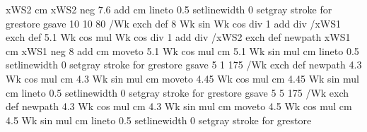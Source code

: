 {{{                    xWS2 cm xWS2 neg 7.6 add cm
                   lineto
                   0.5 setlinewidth
                   0 setgray
                   stroke
                } for
  grestore
  gsave
      10 10 80 { /Wk exch def
                        {8 Wk sin Wk cos div 1 add div} /xWS1 exch def
                        {5.1 Wk cos mul  Wk cos div 1 add div} /xWS2 exch def
                        newpath
                        xWS1 cm xWS1 neg 8 add cm moveto
                        5.1 Wk cos mul cm 5.1 Wk sin mul cm
                        lineto
                        0.5 setlinewidth
                        0 setgray
                        stroke
                   } for
  grestore
  gsave
          5 1 175 { /Wk exch def
                           newpath
                           4.3 Wk cos mul cm 4.3 Wk sin mul cm moveto
                           4.45 Wk cos mul cm 4.45 Wk sin mul cm
                           lineto
                           0.5 setlinewidth
                           0 setgray
                           stroke
                        } for
  grestore
  gsave
         5 5 175 { /Wk exch def
                          newpath
                         4.3 Wk cos mul cm 4.3 Wk sin mul cm moveto
                         4.5 Wk cos mul cm 4.5 Wk sin mul cm
                         lineto
                         0.5 setlinewidth
                         0 setgray
                         stroke
                     } for
  grestore
}}
